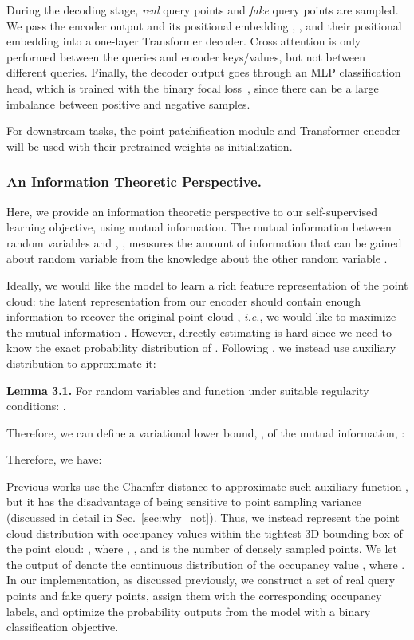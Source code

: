 \documentclass[runningheads]{llncs}
\begin{document}
During the decoding stage,  \textit{real} query points    and  \textit{fake} query points  are sampled. 
We pass the encoder output  and its positional embedding  , ,  and their positional embedding  into a one-layer Transformer decoder.
Cross attention is only performed between the queries and encoder keys/values, but not between different queries.
Finally, the decoder output goes through an MLP classification head, which is trained with the binary focal loss~\cite{focalloss}, since there can be a large imbalance between positive and negative samples.

For downstream tasks, the point patchification module and Transformer encoder will be used with their pretrained weights as initialization. 

\vspace{-10pt}
\subsubsection{An Information Theoretic Perspective.}
Here, we provide an information theoretic perspective to our self-supervised learning objective, using mutual information. The mutual information between random variables  and , , measures the amount of information that can be gained about random variable  from the knowledge about the other random variable . 

Ideally, we would like the model to learn a rich feature representation of the point cloud: the latent representation  from our encoder  should contain enough information to recover the original point cloud , \textit{i.e.}, we would like to maximize the mutual information . However, directly estimating  is hard since we need to know the exact probability distribution of .  Following \cite{chen2016infogan}, we instead use auxiliary distribution  to approximate it:

\textbf{Lemma 3.1.} For random variables  and function  under suitable regularity conditions: .

Therefore, we can define a variational lower bound, , of the mutual information, :

Therefore, we have:


Previous works use the Chamfer distance to approximate such auxiliary function , but it has the disadvantage of being sensitive to point sampling variance (discussed in detail in Sec.~\ref{sec:why_not}).  Thus, we instead represent the point cloud distribution with occupancy values within the tightest 3D bounding box of the point cloud:
, where , , and  is the number of densely sampled points. We let the output of  denote the continuous distribution of the occupancy value , where .
In our implementation, as discussed previously, we construct a set of real query points and fake query points, assign them with the corresponding occupancy labels, and optimize the probability outputs from the model with a binary classification objective.
\end{document}
